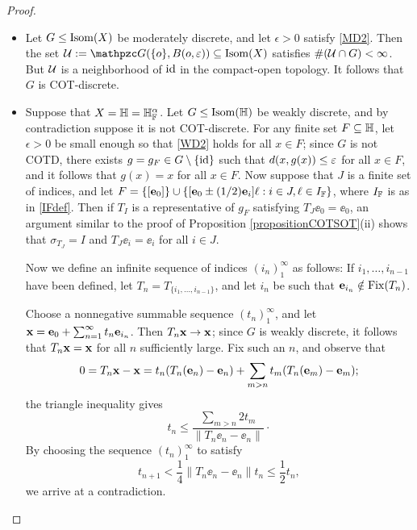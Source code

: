 \begin{proof}~
\begin{itemize}
\item[(i)]
Let $G\leq\operatorname{Isom}(X)$ be moderately discrete, and let $\epsilon > 0$ satisfy \eqref{MD2}. Then the set $\UU := \GG(\{\zero\},B(\zero,\epsilon))\subset\Isom(X)$ satisfies $\#(\mathcal U\cap G) < \infty$. But $\mathcal U$ is a neighborhood of $\mathrm{id}$ in the compact-open topology. It follows that $G$ is COT-discrete.

\item[(ii)]
Suppose that $X = \H = \H_\F^\alpha$. Let $G\leq\Isom(\H)$ be weakly discrete, and by contradiction suppose it is not COT-discrete. For any finite set $F\subset\H$, let $\epsilon > 0$ be small enough so that \eqref{WD2} holds for all $x\in F$; since $G$ is not COTD, there exists $g = g_F\in G\setminus\{\mathrm{id}\}$ such that $d(x,g(x))\leq \varepsilon$ for all $x\in F$, and it follows that $g(x) = x$ for all $x\in F$. Now suppose that $J$ is a finite set of indices, and let $F = \{[\ee_0]\} \cup \{[\ee_0 \pm (1/2)\ee_i] \ell : i\in J, \ell\in I_\F\}$, where $I_\F$ is as in \eqref{IFdef}. Then if $T_I$ is a representative of $g_F$ satisfying $T_J\ee_0 = \ee_0$, an argument similar to the proof of Proposition \ref{propositionCOTSOT}(ii) shows that $\sigma_{T_J} = I$ and $T_J \ee_i = \ee_i$ for all $i\in J$.

Now we define an infinite sequence of indices $(i_n)_1^\infty$ as follows: If $i_1,\ldots,i_{n - 1}$ have been defined, let $T_n = T_{\{i_1,\ldots,i_{n - 1}\}}$, and let $i_n$ be such that $\mathbf e_{i_n}\notin \operatorname{Fix}(T_n)$.

Choose a nonnegative summable sequence $(t_n)_1^\infty$, and let $\mathbf x = \mathbf e_0 + \sum_{n = 1}^\infty t_n \mathbf e_{i_n}$. Then $T_n\mathbf x\to \mathbf x$; since $G$ is weakly discrete, it follows that $T_n\mathbf x = \mathbf x$ for all $n$ sufficiently large. Fix such an $n$, and observe that
\[
0 = T_n\mathbf x - \mathbf x = t_n (T_n(\mathbf e_n) - \mathbf e_n) + \sum_{m > n} t_m (T_n(\mathbf e_m) - \mathbf e_m);
\]
the triangle inequality gives
\[
t_n \leq \frac{\sum_{m > n}2t_m}{\|T_n\ee_n - \ee_n\|}\cdot
\]
By choosing the sequence $(t_n)_1^\infty$ to satisfy
\[
t_{n + 1} < \frac14 \|T_n\ee_n - \ee_n\| t_n \leq \frac12 t_n ,
\]
we arrive at a contradiction.

%
%
%


\end{itemize}
\end{proof}
